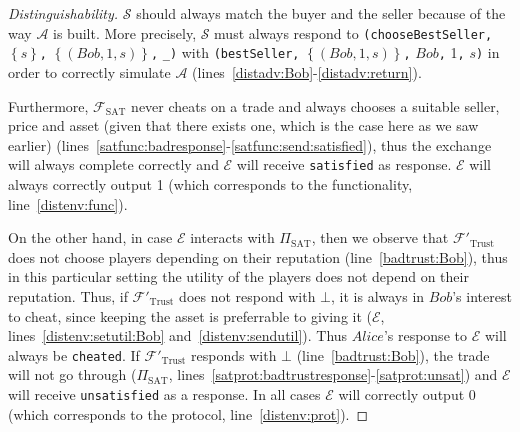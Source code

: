 \begin{proof}[Distinguishability]
    $\mathcal{S}$ should always match the buyer and the seller because of the way
    $\mathcal{A}$ is built. More precisely, $\mathcal{S}$ must always respond to
    \texttt{(chooseBestSeller,} $\left\{s\right\}$\texttt{,} $\left\{\left(Bob, 1,
    s\right)\right\}$\texttt{,} \texttt{\_)} with \texttt{(bestSeller,} $\left\{\left(Bob,
    1, s\right)\right\}$\texttt{,} $Bob$\texttt{,} 1\texttt{,} $s$\texttt{)} in order to
    correctly simulate $\mathcal{A}$ (lines~\ref{distadv:Bob}-\ref{distadv:return}).

    Furthermore, $\mathcal{F}_{\mathrm{SAT}}$ never cheats on a trade and always chooses a
    suitable seller, price and asset (given that there exists one, which is the case here
    as we saw earlier) (lines~\ref{satfunc:badresponse}-\ref{satfunc:send:satisfied}),
    thus the exchange will always complete correctly and $\mathcal{E}$ will receive
    \texttt{satisfied} as response. $\mathcal{E}$ will always correctly output 1 (which
    corresponds to the functionality, line~\ref{distenv:func}).

    On the other hand, in case $\mathcal{E}$ interacts with $\Pi_{\mathrm{SAT}}$, then we
    observe that $\mathcal{F}'_{\mathrm{Trust}}$ does not choose players depending on
    their reputation (line~\ref{badtrust:Bob}), thus in this particular setting the
    utility of the players does not depend on their reputation. Thus, if
    $\mathcal{F}'_{\mathrm{Trust}}$ does not respond with $\bot$, it is always in $Bob$'s
    interest to cheat, since keeping the asset is preferrable to giving it ($\mathcal{E}$,
    lines~\ref{distenv:setutil:Bob} and~\ref{distenv:sendutil}). Thus $Alice$'s response
    to $\mathcal{E}$ will always be \texttt{cheated}. If $\mathcal{F}'_{\mathrm{Trust}}$
    responds with $\bot$ (line~\ref{badtrust:Bob}), the trade will not go through
    ($\Pi_{\mathrm{SAT}}$, lines~\ref{satprot:badtrustresponse}-\ref{satprot:unsat}) and
    $\mathcal{E}$ will receive \texttt{unsatisfied} as a response. In all cases
    $\mathcal{E}$ will correctly output 0 (which corresponds to the protocol,
    line~\ref{distenv:prot}).
  \end{proof}

